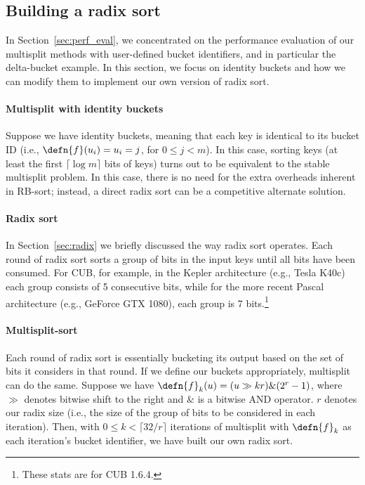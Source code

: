 \subsection{Building a radix sort}\label{subsec:multisplit_sort}
In Section~\ref{sec:perf_eval}, we concentrated on the performance evaluation of our multisplit methods with user-defined bucket identifiers, and in particular the delta-bucket example.
In this section, we focus on identity buckets and how we can modify them to implement our own version of radix sort.

\paragraph{Multisplit with identity buckets} Suppose we have identity buckets, meaning that each key is identical to its bucket ID (i.e., $\defn{f}(u_i) = u_i = j$, for $0\leq j < m$).
In this case, sorting keys (at least the first $\lceil \log m \rceil$ bits of keys) turns out to be equivalent to the stable multisplit problem.
In this case, there is no need for the extra overheads inherent in RB-sort; instead, a direct radix sort can be a competitive alternate solution.

\paragraph{Radix sort} In Section~\ref{sec:radix} we briefly discussed the way radix sort operates.
Each round of radix sort sorts a group of bits in the input keys until all bits have been consumed.
For CUB, for example, in the Kepler architecture (e.g., Tesla K40c) each group consists of 5 consecutive bits, while for the more recent Pascal architecture (e.g., GeForce GTX 1080), each group is 7 bits.\footnote{These stats are for CUB 1.6.4.}

\paragraph{Multisplit-sort} Each round of radix sort is essentially bucketing its output based on the set of bits it considers in that round. If we define our buckets appropriately, multisplit can do the same.
Suppose we have $\defn{f}_k(u) = (u \gg kr) \& (2^{r}-1)$, where $\gg$ denotes bitwise shift to the right and $\&$ is a bitwise AND operator. $r$ denotes our radix size (i.e., the size of the group of bits to be considered in each iteration).
Then, with $0 \leq k < \lceil 32/r\rceil$ iterations of multisplit with $\defn{f}_k$ as each iteration's bucket identifier, we have built our own radix sort.

